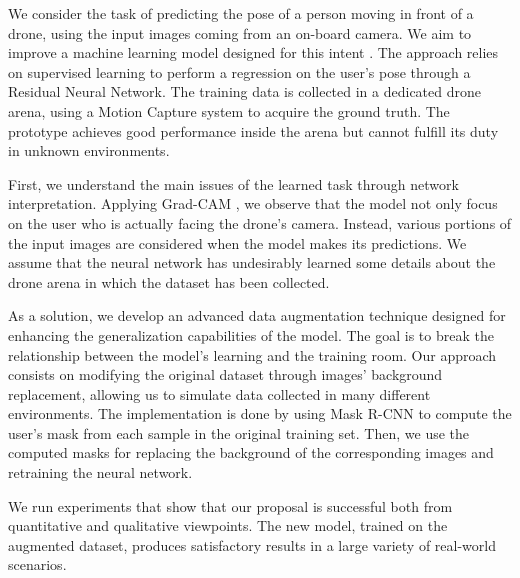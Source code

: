 

We consider the task of predicting the pose of a person moving in front of a drone, using the input images coming from an on-board camera. We aim to improve a machine learning model designed for this intent \cite{mantegazza2019visionbased}. The approach relies on supervised learning to perform a regression on the user's pose through a Residual Neural Network. The training data is collected in a dedicated drone arena, using a Motion Capture system to acquire the ground truth. The prototype achieves good performance inside the arena but cannot fulfill its duty in unknown environments.

\medskip

First, we understand the main issues of the learned task through network interpretation. Applying Grad-CAM \cite{Selvaraju_2019}, we observe that the model not only focus on the user who is actually facing the drone’s camera. Instead, various portions of the input images are considered when the model makes its predictions. We assume that the neural network has undesirably learned some details about the drone arena in which the dataset has been collected.

As a solution, we develop an advanced data augmentation technique designed for
enhancing the generalization capabilities of the model. The goal is to break the relationship between the model's learning and the training room. Our approach consists on modifying the original dataset through images' background replacement, allowing us to simulate data collected in many different environments. The implementation is done by using Mask R-CNN \cite{he2018mask} to compute the user's mask from each sample in the original training set. Then, we use the computed masks for replacing the background of the corresponding images and retraining the neural network.

We run experiments that show that our proposal is successful both from quantitative and qualitative viewpoints. The new model, trained on the augmented dataset, produces satisfactory results in a large variety of real-world scenarios.